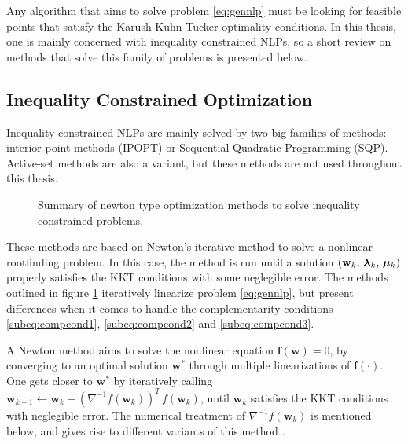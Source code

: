 Any algorithm that aims to solve problem \eqref{eq:gennlp} must be looking for feasible points that satisfy the Karush-Kuhn-Tucker optimality conditions. In this thesis, one is mainly concerned with inequality constrained NLPs, so a short review on methods that solve this family of problems is presented below.

\subsection*{Inequality Constrained Optimization}
\label{subsection:ineqconopt}

Inequality constrained NLPs are mainly solved by two big families of methods: interior-point methods (IPOPT) or Sequential Quadratic Programming (SQP). Active-set methods are also a variant, but these methods are not used throughout this thesis.

\begin{figure}[h]
\centering
{}
\caption{Summary of newton type optimization methods to solve inequality constrained problems.}
\label{fig:methodssolveineqcon}
\end{figure}

These methods are based on Newton's iterative method to solve a nonlinear rootfinding problem. In this case, the method is run until a solution $\left(\mathbf{w}_k,\,\bm{\gmultiplier}_k,\,\bm{\hmultiplier}_k\right)$ properly satisfies the KKT conditions with some neglegible error. The methods outlined in figure \ref{fig:methodssolveineqcon} iteratively linearize problem \eqref{eq:gennlp}, but present differences when it comes to handle the complementarity conditions \eqref{subeq:compcond1}, \eqref{subeq:compcond2} and \eqref{subeq:compcond3}.

\begin{remark}
A Newton method aims to solve the nonlinear equation $\mathbf{f}(\mathbf{w})=0$, by converging to an optimal solution $\mathbf{w}^*$ through multiple linearizations of $\mathbf{f}(\cdot)$. One gets closer to $\mathbf{w}^*$ by iteratively calling $\mathbf{w}_{k+1} \gets \mathbf{w}_k - \left(\nabla^{-1} f\left(\mathbf{w}_k\right)\right)^T \, f\left(\mathbf{w}_k\right)$, until $\mathbf{w}_k$ satisfies the KKT conditions with neglegible error. The numerical treatment of $\nabla^{-1} f\left(\mathbf{w}_k\right)$ is mentioned below, and gives rise to different variants of this method \cite{diehl2009efficient, diehlnumericalocp}.
\end{remark}

